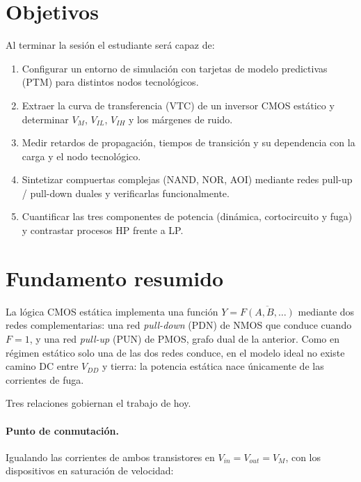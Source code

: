 \documentclass[11pt,a4paper]{article}
\begin{document}
\section{Objetivos}

Al terminar la sesión el estudiante será capaz de:

\begin{enumerate}[leftmargin=1.6em,itemsep=0.35em]
  \item Configurar un entorno de simulación con tarjetas de modelo predictivas (PTM) para distintos nodos tecnológicos.
  \item Extraer la curva de transferencia (VTC) de un inversor CMOS estático y determinar $V_M$, $V_{IL}$, $V_{IH}$ y los márgenes de ruido.

  \item Medir retardos de propagación, tiempos de transición y su dependencia con la carga y el nodo tecnológico.
  \item Sintetizar compuertas complejas (NAND, NOR, AOI) mediante redes pull-up / pull-down duales y verificarlas funcionalmente.
  \item Cuantificar las tres componentes de potencia (dinámica, cortocircuito y fuga) y contrastar procesos HP frente a LP.
\end{enumerate}

\section{Fundamento resumido}

La lógica CMOS estática implementa una función $Y = \overline{F(A,B,\dots)}$ mediante dos redes complementarias: una red \emph{pull-down} (PDN) de NMOS que conduce cuando $F=1$, y una red \emph{pull-up} (PUN) de PMOS, grafo dual de la anterior. Como en régimen estático solo una de las dos redes conduce, en el modelo ideal no existe camino DC entre $V_{DD}$ y tierra: la potencia estática nace únicamente de las corrientes de fuga.

Tres relaciones gobiernan el trabajo de hoy.

\paragraph{Punto de conmutación.} Igualando las corrientes de ambos transistores en $V_{in}=V_{out}=V_M$, con los dispositivos en saturación de velocidad:
\end{document}
